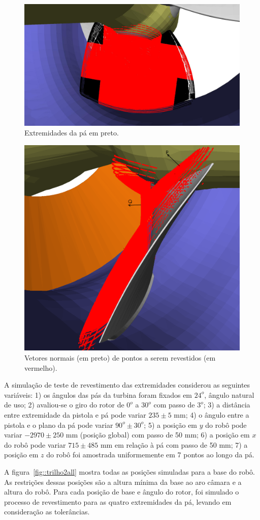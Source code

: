 \begin{figure}[!ht]
	\centering	
	\includegraphics[width=.8\columnwidth]{figs/tocoat.jpg}
	\caption{Extremidades da pá em preto.}
	\label{fig::extremidades}
\end{figure}

\begin{figure}[!ht]
	\centering	
	\includegraphics[width=.5\columnwidth]{figs/normal.png}
	\caption{Vetores normais (em preto) de pontos a serem revestidos (em
	vermelho).}
	\label{fig::normal}
\end{figure}

A simulação de teste de revestimento das extremidades considerou as seguintes
variáveis: 1) os ângulos das pás da turbina foram fixados em $24^o$, ângulo
natural de uso; 2) avaliou-se o giro do rotor de $0^o$ a $30^o$ com passo de
$3^o$; 3) a distância entre extremidade da pistola e pá pode variar $235 \pm 5$
mm; 4) o ângulo entre a pistola e o plano da pá pode variar $90^o \pm 30^o$; 5)
a posição em $y$ do robô pode variar $-2970 \pm 250$ mm (posição global) com
passo de 50 mm; 6) a posição em $x$ do robô pode variar $715 \pm 485$ mm em
relação à pá com passo de 50 mm; 7) a posição em $z$ do robô foi amostrada
uniformemente em 7 pontos ao longo da pá.

A figura~\ref{fig::trilho2all} mostra todas as posições simuladas para a base do
robô. As restrições dessas posições são a altura mínima da base ao aro câmara e
a altura do robô. Para cada posição de base e ângulo do rotor, foi simulado o
processo de revestimento para as quatro extremidades da pá, levando em
consideração as tolerâncias.

